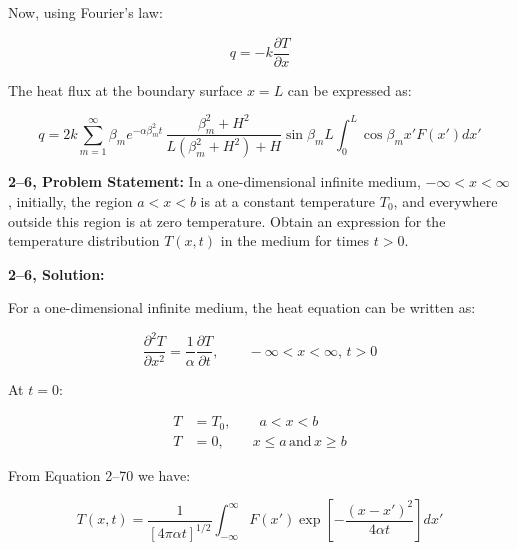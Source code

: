 \documentclass[letterpaper,12pt]{article}
\begin{document}
Now, using Fourier's law:

\begin{equation}
    q = -k \frac{\partial T}{\partial x}
\end{equation}

The heat flux at the boundary surface $x = L$ can be expressed as:

\begin{equation}
\boxed{
    q = 2k \sum_{m=1}^{{\infty}} \beta_m e ^{- \alpha \beta^{2}_m t} \, \frac{\beta^{2}_m + H^2}{L\left(\beta^{2}_m + H^2 \right) + H} \sin{\beta_m L} \int_{0}^{L} \cos{\beta_m x'} F(x') dx'
}
\end{equation}


\vspace{6pt}


\textbf{2--6, Problem Statement:}
In a one-dimensional infinite medium, $-\infty < x < \infty$, initially, the region $a < x < b$ is at a constant temperature $T_0$, and everywhere outside this region is at zero temperature. Obtain an expression for the temperature distribution $T \left( x, t \right)$ in the medium for times $t > 0$.

\vspace{6pt}

\textbf{2--6, Solution:}

For a one-dimensional infinite medium, the heat equation can be written as:

\begin{equation}
    \frac{\partial^2 T}{\partial x^2} = \frac{1}{\alpha} \frac{\partial T}{\partial t}, \qquad -\infty < x < \infty, \, t > 0
\end{equation}

At $t = 0$:

\begin{equation}
\begin{aligned}
    T &= T_0, \qquad a < x < b \\
    T &= 0, \qquad x \leq a \, \mathrm{and} \, x \geq b
\end{aligned}
\end{equation}

From Equation 2--70 we have:

\begin{equation}
    T(x, t) = \frac{1}{\left[ 4 \pi \alpha t \right]^{1/2}} \int_{-\infty}^{\infty} F(x') \exp{\left[ -\frac{(x - x')^2}{4 \alpha t} \right] dx'}
\end{equation}
\end{document}
